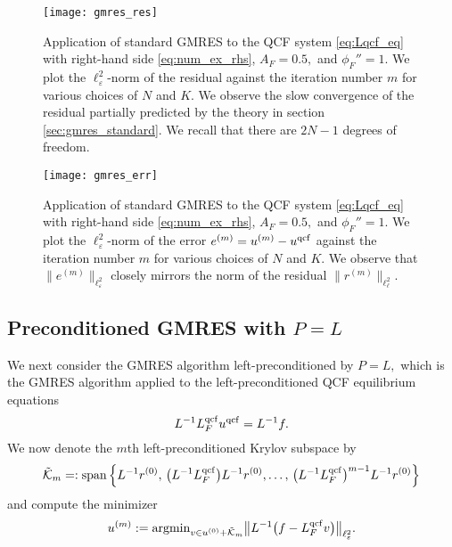 \documentclass[12pt,reqno]{amsart}
\begin{document}
\begin{figure}
  \begin{center}
    \texttt{[image: gmres\_res]}
  \end{center}
  \caption{\label{fig:gmres_res} Application of standard GMRES to the
    QCF system \eqref{eq:Lqcf_eq} with right-hand side
    \eqref{eq:num_ex_rhs}, $A_F = 0.5,$ and $\phi_F'' = 1$. We plot
    the $\ell^2_{\varepsilon}$-norm of the residual against the iteration
    number $m$ for various choices of $N$ and $K$. We observe the slow
    convergence of the residual partially predicted by the theory in
    section \ref{sec:gmres_standard}.  We recall that there are $2N-1$
    degrees of freedom. }
\end{figure}

\begin{figure}
  \begin{center}
    \texttt{[image: gmres\_err]}
  \end{center}
  \caption{\label{fig:gmres_err} Application of standard GMRES to the
    QCF system \eqref{eq:Lqcf_eq} with right-hand side
    \eqref{eq:num_ex_rhs}, $A_F = 0.5,$ and $\phi_F'' = 1$. We plot
    the $\ell^2_{\varepsilon}$-norm of the error $e^{(m)} = u^{(m)} - u^{\rm
      qcf}$ against the iteration number $m$ for various choices of
    $N$ and $K$. We observe that $\|e^{(m)}\|_{\ell^2_{\varepsilon}}$ closely
    mirrors the norm of the residual $\|r^{(m)}\|_{\ell^2_\ell}$. }
\end{figure}

\subsection{Preconditioned GMRES with $P={{L}}$}
\label{sec:P-GMRES}
We next consider the GMRES algorithm left-preconditioned by $P={{L}},$
which is the GMRES algorithm applied to the left-preconditioned QCF
equilibrium equations~\cite{saad}
\begin{equation}
{{L}}^{-1}{L^{{\rm qcf}}_F} {u^{{\rm qcf}}} = {{L}}^{-1}f
\label{eq:Lqcf_eqp}.
\end{equation}
We now denote the $m$th left-preconditioned Krylov subspace by
\begin{equation*}
  \tilde {\mathcal{K}}_m =: \operatorname{span} \Big\{
  {{L}}^{-1}r^{(0)},\, \big({{L}}^{-1}{L^{{\rm qcf}}_F}\big)
  {{L}}^{-1}r^{(0)},
  \dots, \,
  \big({{L}}^{-1}{L^{{\rm qcf}}_F}\big)^{m-1} {{L}}^{-1}r^{(0)}\Big\}
\end{equation*}
and compute the minimizer
\begin{equation*}
  u^{(m)} := {{\rm argmin}}_{v \in u^{(0)}+\tilde{\mathcal{K}}_m} \big\|
  {{L}}^{-1}\big(f - {L^{{\rm qcf}}_F} v\big)\big\|_{\ell^2_{\varepsilon}}.
\end{equation*}
\end{document}
